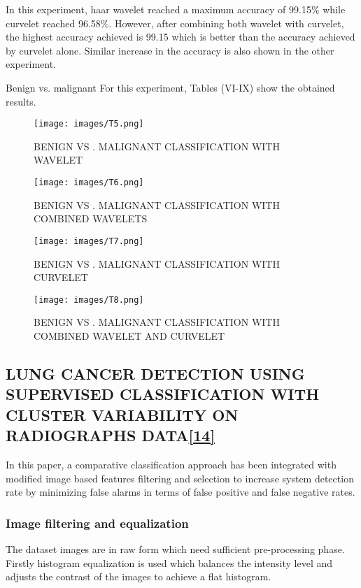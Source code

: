 \documentclass[hidelinks,12pt]{article}
\begin{document}
In this experiment, haar wavelet reached a maximum
accuracy of 99.15\% while curvelet reached 96.58\%.
However, after combining both wavelet with curvelet, the
highest accuracy achieved is 99.15 which is better than the
accuracy achieved by curvelet alone. Similar increase in the
accuracy is also shown in the other experiment.


Benign vs. malignant
For this experiment, Tables (VI-IX) show the obtained
results.
\newpage
\begin{figure}[h]
      \texttt{[image: images/T5.png]}
      \centering
      \label{fig:17}
      \caption{BENIGN VS . MALIGNANT CLASSIFICATION WITH WAVELET}
\end{figure}

\begin{figure}[h]
      \texttt{[image: images/T6.png]}
      \centering
      \label{fig:18}
      \caption{BENIGN VS . MALIGNANT CLASSIFICATION WITH COMBINED
WAVELETS}
\end{figure}
\newpage

\begin{figure}[h]
      \texttt{[image: images/T7.png]}
      \centering
      \label{fig:19}
      \caption{BENIGN VS . MALIGNANT CLASSIFICATION WITH CURVELET}
\end{figure}

\begin{figure}[h]
      \texttt{[image: images/T8.png]}
      \centering
      \label{fig:20}
      \caption{BENIGN VS . MALIGNANT CLASSIFICATION WITH COMBINED
WAVELET AND CURVELET}
\end{figure}


\newpage
\subsection{LUNG CANCER DETECTION USING SUPERVISED CLASSIFICATION
WITH CLUSTER VARIABILITY ON RADIOGRAPHS DATA\hyperref[14]{[14]}}
In this paper, a comparative classification
approach has been integrated with modified image based
features filtering and selection to increase system detection
rate by minimizing false alarms in terms of false positive
and false negative rates.
\subsubsection{Image filtering and equalization}
The dataset images are in raw form which need
sufficient pre-processing phase. Firstly histogram
equalization is used which balances the intensity level and
adjusts the contrast of the images to achieve a flat
histogram.\\
\end{document}
